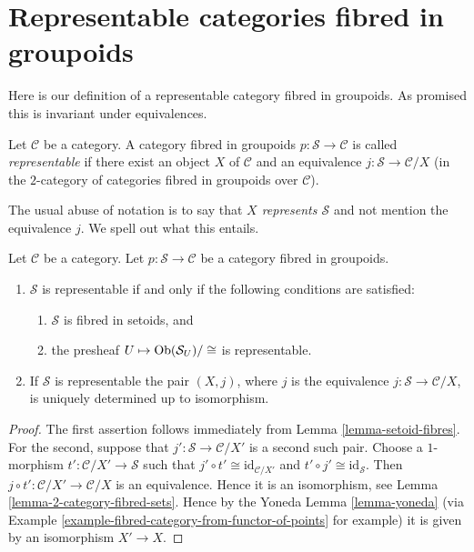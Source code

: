 \section{Representable categories fibred in groupoids}
\label{section-representable-fibred-groupoids}

\noindent
Here is our definition of a representable category fibred in groupoids.
As promised this is invariant under equivalences.

\begin{definition}
\label{definition-representable-fibred-category}
Let $\mathcal{C}$ be a category.
A category fibred in groupoids $p : \mathcal{S} \to \mathcal{C}$ is
called {\it representable} if there exist an object
$X$ of $\mathcal{C}$ and an equivalence $j : \mathcal{S} \to \mathcal{C}/X$
(in the $2$-category of categories fibred in groupoids over $\mathcal{C}$).
\end{definition}

\noindent
The usual abuse of notation is to say that {\it $X$ represents $\mathcal{S}$}
and not mention the equivalence $j$. We spell out what this entails.

\begin{lemma}
\label{lemma-characterize-representable-fibred-category}
Let $\mathcal{C}$ be a category.
Let $p : \mathcal{S} \to \mathcal{C}$ be a category fibred in groupoids.
\begin{enumerate}
\item $\mathcal{S}$ is representable if and only if
the following conditions are satisfied:
\begin{enumerate}
\item $\mathcal{S}$ is fibred in setoids, and
\item the presheaf $U \mapsto \mathop{\mathrm{Ob}}\nolimits(\mathcal{S}_U)/\cong$ is
representable.
\end{enumerate}
\item If $\mathcal{S}$ is representable the pair $(X, j)$, where $j$ is the
equivalence $j : \mathcal{S} \to \mathcal{C}/X$, is uniquely determined
up to isomorphism.
\end{enumerate}
\end{lemma}

\begin{proof}
The first assertion follows immediately from
Lemma \ref{lemma-setoid-fibres}.
For the second, suppose that $j' : \mathcal{S} \to \mathcal{C}/X'$ is
a second such pair. Choose a $1$-morphism
$t' : \mathcal{C}/X' \to \mathcal{S}$ such that
$j' \circ t' \cong \text{id}_{\mathcal{C}/X'}$ and
$t' \circ j' \cong \text{id}_\mathcal{S}$. Then
$j \circ t' : \mathcal{C}/X' \to \mathcal{C}/X$ is an equivalence.
Hence it is an isomorphism, see Lemma \ref{lemma-2-category-fibred-sets}.
Hence by the Yoneda Lemma \ref{lemma-yoneda} (via
Example \ref{example-fibred-category-from-functor-of-points} for example)
it is given by an isomorphism $X' \to X$.
\end{proof}

